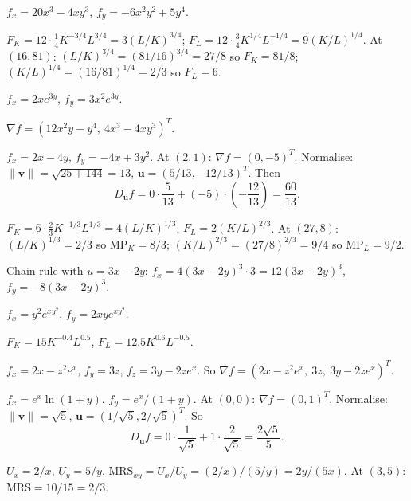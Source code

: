 \begin{solutions}
  \item $f_x=20x^3-4xy^3$, $f_y=-6x^2y^2+5y^4$.

  \item $F_K=12\cdot\frac14K^{-3/4}L^{3/4}=3(L/K)^{3/4}$;
        $F_L=12\cdot\frac34K^{1/4}L^{-1/4}=9(K/L)^{1/4}$. At $(16,81)$:
        $(L/K)^{3/4}=(81/16)^{3/4}=27/8$ so $F_K=81/8$;
        $(K/L)^{1/4}=(16/81)^{1/4}=2/3$ so $F_L=6$.

  \item $f_x=2xe^{3y}$, $f_y=3x^2e^{3y}$.

  \item $\nabla f=(12x^2y-y^4,\ 4x^3-4xy^3)^T$.

  \item $f_x=2x-4y$, $f_y=-4x+3y^2$. At $(2,1)$: $\nabla f=(0,-5)^T$.
        Normalise: $\|\mathbf{v}\|=\sqrt{25+144}=13$,
        $\mathbf{u}=(5/13,-12/13)^T$. Then
        \[
          D_{\mathbf{u}}f=0\cdot\frac{5}{13}+(-5)\cdot
            \left(-\frac{12}{13}\right)=\frac{60}{13} .
        \]

  \item $F_K=6\cdot\frac23K^{-1/3}L^{1/3}=4(L/K)^{1/3}$,
        $F_L=2(K/L)^{2/3}$. At $(27,8)$: $(L/K)^{1/3}=2/3$ so
        $\mathrm{MP}_K=8/3$; $(K/L)^{2/3}=(27/8)^{2/3}=9/4$ so
        $\mathrm{MP}_L=9/2$.

  \item Chain rule with $u=3x-2y$: $f_x=4(3x-2y)^3\cdot3=12(3x-2y)^3$,
        $f_y=-8(3x-2y)^3$.

  \item $f_x=y^2e^{xy^2}$, $f_y=2xye^{xy^2}$.

  \item $F_K=15K^{-0.4}L^{0.5}$, $F_L=12.5K^{0.6}L^{-0.5}$.

  \item $f_x=2x-z^2e^x$, $f_y=3z$, $f_z=3y-2ze^x$. So
        $\nabla f=(2x-z^2e^x,\ 3z,\ 3y-2ze^x)^T$.

  \item $f_x=e^x\ln(1+y)$, $f_y=e^x/(1+y)$. At $(0,0)$:
        $\nabla f=(0,1)^T$. Normalise: $\|\mathbf{v}\|=\sqrt5$,
        $\mathbf{u}=(1/\sqrt5,2/\sqrt5)^T$. So
        \[
          D_{\mathbf{u}}f=0\cdot\frac{1}{\sqrt5}+1\cdot\frac{2}{\sqrt5}
            =\frac{2\sqrt5}{5} .
        \]

  \item $U_x=2/x$, $U_y=5/y$. $\mathrm{MRS}_{xy}=U_x/U_y
        =(2/x)/(5/y)=2y/(5x)$. At $(3,5)$: $\mathrm{MRS}=10/15=2/3$.


\end{solutions}
